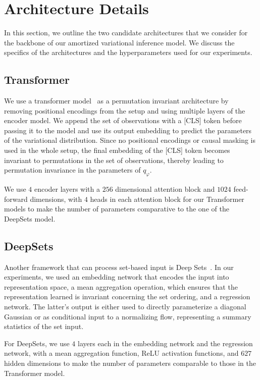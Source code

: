 \section{Architecture Details}
\label{appdx:architecture}
In this section, we outline the two candidate architectures that we consider for the backbone of our amortized variational inference model. We discuss the specifics of the architectures and the hyperparameters used for our experiments.

\subsection{Transformer}
\label{subsec:transformer}
We use a transformer model~\citep{vaswani2017attention} as a permutation invariant architecture by removing positional encodings from the setup and using multiple layers of the encoder model. We append the set of observations with a [CLS] token before passing it to the model and use its output embedding to predict the parameters of the variational distribution. Since no positional encodings or causal masking is used in the whole setup, the final embedding of the [CLS] token becomes invariant to permutations in the set of observations, thereby leading to permutation invariance in the parameters of $q_\varphi$.

We use $4$ encoder layers with a $256$ dimensional attention block and $1024$ feed-forward dimensions, with $4$ heads in each attention block for our Transformer models to make the number of parameters comparative to the one of the DeepSets model.

\subsection{DeepSets}
\label{subsec:deepsets}
Another framework that can process set-based input is Deep Sets~\citep{Zaheer2017deepsets}. In our experiments, we used an embedding network that encodes the input into representation space, a mean aggregation operation, which ensures that the representation learned is invariant concerning the set ordering, and a regression network. The latter's output is either used to directly parameterize a diagonal Gaussian or as conditional input to a normalizing flow, representing a summary statistics of the set input.

For DeepSets, we use $4$ layers each in the embedding network and the regression network, with a mean aggregation function, ReLU activation functions, and $627$ hidden dimensions to make the number of parameters comparable to those in the Transformer model.

